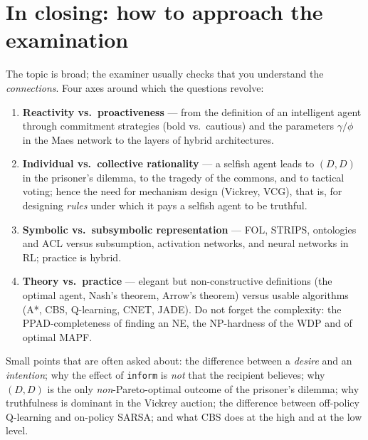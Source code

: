 \documentclass[11pt,a4paper]{article}
\theoremstyle{definition}
\begin{document}
\section*{In closing: how to approach the examination}

The topic is broad; the examiner usually checks that you understand the \emph{connections}.
Four axes around which the questions revolve:
\begin{enumerate}
\item \textbf{Reactivity vs.\ proactiveness} --- from the definition of an intelligent agent
  through commitment strategies (bold vs.\ cautious) and the parameters $\gamma/\phi$ in the
  Maes network to the layers of hybrid architectures.
\item \textbf{Individual vs.\ collective rationality} --- a selfish agent leads to $(D,D)$ in
  the prisoner's dilemma, to the tragedy of the commons, and to tactical voting; hence the need
  for mechanism design (Vickrey, VCG), that is, for designing \emph{rules} under which it pays a
  selfish agent to be truthful.
\item \textbf{Symbolic vs.\ subsymbolic representation} --- FOL, STRIPS, ontologies and ACL
  versus subsumption, activation networks, and neural networks in RL; practice is hybrid.
\item \textbf{Theory vs.\ practice} --- elegant but non-constructive definitions (the optimal
  agent, Nash's theorem, Arrow's theorem) versus usable algorithms (A*, CBS, Q-learning, CNET,
  JADE). Do not forget the complexity: the PPAD-completeness of finding an NE, the NP-hardness
  of the WDP and of optimal MAPF.
\end{enumerate}

Small points that are often asked about: the difference between a \emph{desire} and an
\emph{intention}; why the effect of \texttt{inform} is \emph{not} that the recipient believes;
why $(D,D)$ is the only \emph{non}-Pareto-optimal outcome of the prisoner's dilemma; why
truthfulness is dominant in the Vickrey auction; the difference between off-policy Q-learning
and on-policy SARSA; and what CBS does at the high and at the low level.
\end{document}
